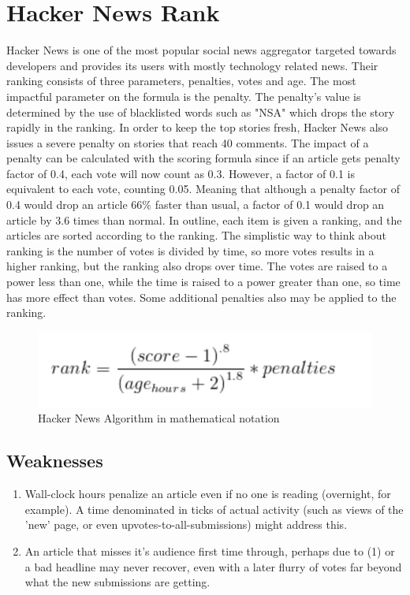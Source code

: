 \section{Hacker News Rank}
Hacker News is one of the most popular social news aggregator targeted towards developers and provides its users with mostly technology related news. Their ranking consists of three parameters, penalties, votes and age. The most impactful parameter on the formula is the penalty. The penalty's value is determined by the use of blacklisted words such as "NSA" which drops the story rapidly in the ranking. In order to keep the top stories fresh, Hacker News also issues a severe penalty on stories that reach 40 comments. The impact of a penalty can be calculated with the scoring formula since if an article gets penalty factor of 0.4, each vote will now count as 0.3. However, a factor of 0.1 is equivalent to each vote, counting 0.05. Meaning that although a penalty factor of 0.4 would drop an article 66\% faster than usual, a factor of  0.1 would drop an article by 3.6 times than normal. In outline, each item is given a ranking, and the articles are sorted according to the ranking. The simplistic way to think about ranking is the number of votes is divided by time, so more votes results in a higher ranking, but the ranking also drops over time. The votes are raised to a power less than one, while the time is raised to a power greater than one, so time has more effect than votes. Some additional penalties also may be applied to the ranking.

\begin{figure} [!htb]
  \centering
	\includegraphics{Figures/hacker_news_rank}
\caption{Hacker News Algorithm in mathematical notation}
\end{figure}

\subsection {Weaknesses}
\begin{enumerate}
  \item Wall-clock hours penalize an article even if no one is reading (overnight, for example). A time denominated in ticks of actual activity (such as views of the 'new' page, or even upvotes-to-all-submissions) might address this.
  \item An article that misses it's audience first time through, perhaps due to (1) or a bad headline may never recover, even with a later flurry of votes far beyond what the new submissions are getting.
\end{enumerate}

